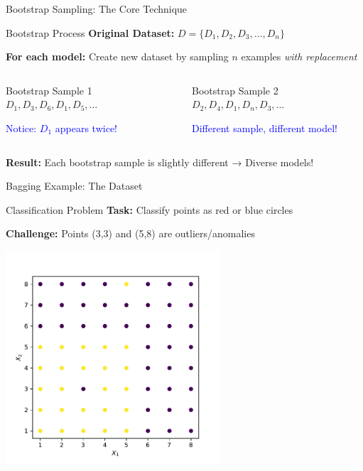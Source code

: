 \documentclass[10pt]{beamer}
\newcommand{\fitpic}[1]{\begin{adjustbox}{max width=\linewidth, max totalheight=0.78\textheight}#1\end{adjustbox}}
\begin{document}
\begin{frame}{Bootstrap Sampling: The Core Technique}
\begin{examplebox}{Bootstrap Process}
\textbf{Original Dataset:} $D = \{D_1, D_2, D_3, \ldots, D_n\}$

\textbf{For each model:} Create new dataset by sampling $n$ examples \emph{with replacement}
\end{examplebox}

\begin{columns}
\begin{column}{0.5\textwidth}
\begin{definitionbox}{Bootstrap Sample 1}
$D_1, D_3, D_6, D_1, D_5, \ldots$

\textcolor{blue}{Notice: $D_1$ appears twice!}
\end{definitionbox}
\end{column}

\begin{column}{0.5\textwidth}
\begin{definitionbox}{Bootstrap Sample 2}
$D_2, D_4, D_1, D_n, D_3, \ldots$

\textcolor{blue}{Different sample, different model!}
\end{definitionbox}
\end{column}
\end{columns}

\begin{keypointsbox}
\textbf{Result:} Each bootstrap sample is slightly different → Diverse models!
\end{keypointsbox}
\end{frame}

\begin{frame}{Bagging Example: The Dataset}
\begin{alertbox}{Classification Problem}
\textbf{Task:} Classify points as red or blue circles

\textbf{Challenge:} Points (3,3) and (5,8) are outliers/anomalies
\end{alertbox}

  \begin{center}
  \fitpic{\includegraphics[width = 0.6\textwidth]{../assets/ensemble/figures/dataset}}
  \end{center}
\end{frame}
\end{document}
